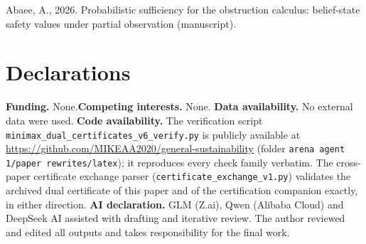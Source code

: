 \documentclass[10pt,twocolumn]{article}
\theoremstyle{definition}
\begin{document}
Abaee, A., 2026. Probabilistic sufficiency for the obstruction calculus:
belief-state safety values under partial observation (manuscript).

\section*{Declarations}
\textbf{Funding.} None.\quad \textbf{Competing interests.} None.\quad
\textbf{Data availability.} No external data were used.\quad
\textbf{Code availability.} The verification script
\texttt{minimax\_dual\_certificates\_v6\_verify.py} is publicly available
at \url{https://github.com/MIKEAA2020/general-sustainability} (folder
\texttt{arena agent 1/paper rewrites/latex}); it reproduces every check family verbatim. The cross-paper certificate
exchange parser (\texttt{certificate\_exchange\_v1.py}) validates the
archived dual certificate of this paper and of the certification companion
exactly, in either direction.\quad
\textbf{AI declaration.} GLM (Z.ai), Qwen (Alibaba Cloud) and DeepSeek AI
assisted with drafting and iterative review. The author reviewed and
edited all outputs and takes responsibility for the final work.
\end{document}
